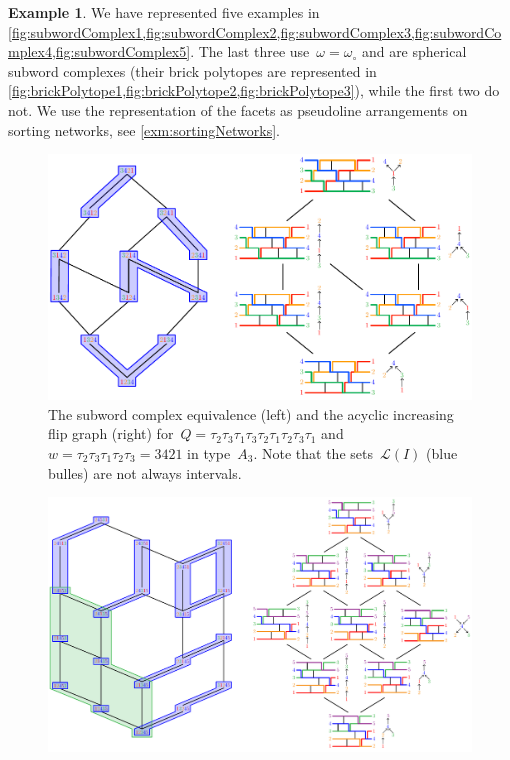 \documentclass[reqno]{amsart}
\theoremstyle{definition}
\newtheorem{example}[theorem]{Example}
\newcommand{\linearExtensions}{\mathcal{L}} %
\newcommand{\wo}{\omega_\circ} %
\begin{document}
\begin{example}
We have represented five examples in \cref{fig:subwordComplex1,fig:subwordComplex2,fig:subwordComplex3,fig:subwordComplex4,fig:subwordComplex5}.
The last three use~$\omega = \wo$ and are spherical subword complexes (their brick polytopes are represented in \cref{fig:brickPolytope1,fig:brickPolytope2,fig:brickPolytope3}), while the first two do not.
We use the representation of the facets as pseudoline arrangements on sorting networks, see \cref{exm:sortingNetworks}.
%
\begin{figure}[p]
	\centerline{\includegraphics[scale=.7]{subwordComplex4}}
	\caption{The subword complex equivalence (left) and the acyclic increasing flip graph (right) for~$Q = \tau_2 \tau_3 \tau_1 \tau_3 \tau_2 \tau_1 \tau_2 \tau_3 \tau_1$ and~$w = \tau_2 \tau_3 \tau_1 \tau_2 \tau_3 = 3421$ in type~$A_3$. Note that the sets~$\linearExtensions(I)$ (blue bulles) are not always intervals.}
	\label{fig:subwordComplex4}
\end{figure}
%
\begin{figure}[p]
	\centerline{\includegraphics[scale=.7]{subwordComplex5}}

\end{figure}
\end{example}
\end{document}
